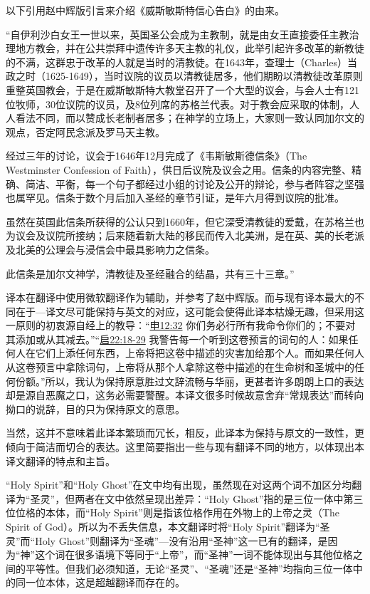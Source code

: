 \documentclass[12pt, a4paper, oneside]{ctexart}
\begin{document}
以下引用赵中辉版引言来介绍《威斯敏斯特信心告白》的由来。

“自伊利沙白女王一世以来，英国圣公会成为主教制，就是由女王直接委任主教治理地方教会，并在公共崇拜中遗传许多天主教的礼仪，此举引起许多改革的新教徒的不满，这群忠于改革的人就是当时的清教徒。在1643年，查理士（Charles）当政之时（1625-1649），当时议院的议员以清教徒居多，他们期盼以清教徒改革原则重整英国教会，于是在威斯敏斯特大教堂召开了一个大型的议会，与会人士有121位牧师，30位议院的议员，及8位列席的苏格兰代表。对于教会应采取的体制，人人看法不同，而以赞成长老制者居多；在神学的立场上，大家则一致认同加尔文的观点，否定阿民念派及罗马天主教。

经过三年的讨论，议会于1646年12月完成了《韦斯敏斯德信条》（The Westminster Confession of Faith），供日后议院及议会之用。信条的内容完整、精确、简洁、平衡，每一个句子都经过小组的讨论及公开的辩论，参与者阵容之坚强也属罕见。信条于数个月后加入圣经的章节引证，是年六月得到议院的批准。

虽然在英国此信条所获得的公认只到1660年，但它深受清教徒的爱戴，在苏格兰也为议会及议院所接纳；后来随着新大陆的移民而传入北美洲，是在英、美的长老派及北美的公理会与浸信会中最具影响力之信条。

此信条是加尔文神学，清教徒及圣经融合的结晶，共有三十三章。”

译本在翻译中使用微软翻译作为辅助，并参考了赵中辉版。而与现有译本最大的不同在于---译文尽可能保持与英文的对应，这可能会使得此译本枯燥无趣，但采用这一原则的初衷源自经上的教导：“\href{https://biblehub.com/deuteronomy/12-32.htm}{申12:32} 你们务必行所有我命令你们的；不要对其添加或从其减去。”“\href{https://biblehub.com/revelation/22-18.htm}{启22:18-29} 我警告每一个听到这卷预言的词句的人：如果任何人在它们上添任何东西，上帝将把这卷中描述的灾害加给那个人。而如果任何人从这卷预言中拿除词句，上帝将从那个人拿除这卷中描述的在生命树和圣城中的任何份额。”所以，我认为保持原意胜过文辞流畅与华丽，更甚者许多朗朗上口的表达却是源自恶魔之口，这务必需要警醒。本译文很多时候故意舍弃“常规表达”而转向拗口的说辞，目的只为保持原文的意思。

当然，这并不意味着此译本繁琐而冗长，相反，此译本为保持与原文的一致性，更倾向于简洁而切合的表达。这里简要指出一些与现有翻译不同的地方，以体现出本译文翻译的特点和主旨。

“Holy Spirit”和“Holy Ghost”在文中均有出现，虽然现在对这两个词不加区分均翻译为“圣灵”，但两者在文中依然呈现出差异：“Holy Ghost”指的是三位一体中第三位位格的本体，而“Holy Spirit”则是指该位格作用在外物上的上帝之灵（The Spirit of God）。所以为不丢失信息，本文翻译时将“Holy Spirit”翻译为“圣灵”而“Holy Ghost”则翻译为“圣魂”---没有沿用“圣神”这一已有的翻译，是因为“神”这个词在很多语境下等同于“上帝”，而“圣神”一词不能体现出与其他位格之间的平等性。但我们必须知道，无论“圣灵”、“圣魂”还是“圣神”均指向三位一体中的同一位本体，这是超越翻译而存在的。
\end{document}
